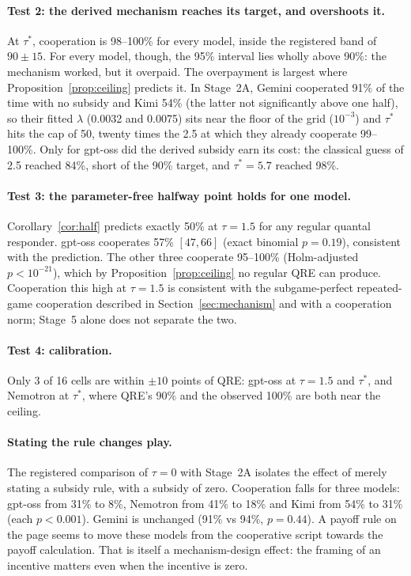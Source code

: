\documentclass[11pt]{article}
\theoremstyle{definition}
\theoremstyle{remark}
\newcommand{\lam}{\lambda}
\begin{document}
\paragraph{Test 2: the derived mechanism reaches its target, and overshoots it.} At $\tau^*$,
cooperation is 98--100\% for every model, inside the registered band of $90\pm15$. For every
model, though, the 95\% interval lies wholly above 90\%: the mechanism worked, but it overpaid.
The overpayment is largest where Proposition~\ref{prop:ceiling} predicts it. In Stage~2A,
Gemini cooperated 91\% of the time with no subsidy and Kimi 54\% (the latter not significantly
above one half), so their fitted $\lam$ (0.0032 and 0.0075) sits near the floor of the grid
($10^{-3}$) and $\tau^*$ hits the cap of 50, twenty times the 2.5 at which they already cooperate
99--100\%. Only for gpt-oss did the derived subsidy earn its cost: the classical guess of 2.5
reached 84\%, short of the 90\% target, and $\tau^*=5.7$ reached 98\%.

\paragraph{Test 3: the parameter-free halfway point holds for one model.} Corollary~\ref{cor:half}
predicts exactly 50\% at $\tau=1.5$ for any regular quantal responder. gpt-oss cooperates 57\%
$[47,66]$ (exact binomial $p=0.19$), consistent with the prediction. The other three cooperate
95--100\% (Holm-adjusted $p<10^{-21}$), which by Proposition~\ref{prop:ceiling} no regular QRE
can produce. Cooperation this high at $\tau=1.5$ is consistent with the subgame-perfect
repeated-game cooperation described in Section~\ref{sec:mechanism} and with a cooperation norm;
Stage~5 alone does not separate the two.

\paragraph{Test 4: calibration.} Only 3 of 16 cells are within $\pm10$ points of QRE: gpt-oss at
$\tau=1.5$ and $\tau^*$, and Nemotron at $\tau^*$, where QRE's 90\% and the observed 100\% are
both near the ceiling.

\paragraph{Stating the rule changes play.} The registered comparison of $\tau=0$ with Stage~2A
isolates the effect of merely stating a subsidy rule, with a subsidy of zero. Cooperation falls
for three models: gpt-oss from 31\% to 8\%, Nemotron from 41\% to 18\% and Kimi from 54\% to
31\% (each $p<0.001$). Gemini is unchanged (91\% vs 94\%, $p=0.44$). A payoff rule on the page
seems to move these models from the cooperative script towards the payoff calculation. That is
itself a mechanism-design effect: the framing of an incentive matters even when the incentive is
zero.
\end{document}
